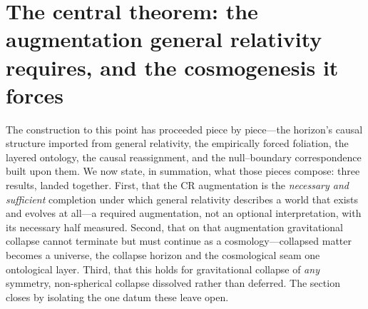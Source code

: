 \documentclass[11pt,a4paper]{article}
\theoremstyle{plain}
\theoremstyle{definition}
\theoremstyle{remark}
\begin{document}
\section{The central theorem: the augmentation general relativity requires, and the cosmogenesis it forces}\label{sec:central}

The construction to this point has proceeded piece by piece---the horizon's causal structure imported from general relativity, the empirically forced foliation, the layered ontology, the causal reassignment, and the null--boundary correspondence built upon them. We now state, in summation, what those pieces compose: three results, landed together. First, that the CR augmentation is the \emph{necessary and sufficient} completion under which general relativity describes a world that exists and evolves at all---a required augmentation, not an optional interpretation, with its necessary half measured. Second, that on that augmentation gravitational collapse cannot terminate but must continue as a cosmology---collapsed matter becomes a universe, the collapse horizon and the cosmological seam one ontological layer. Third, that this holds for gravitational collapse of \emph{any} symmetry, non-spherical collapse dissolved rather than deferred. The section closes by isolating the one datum these leave open.
\end{document}
